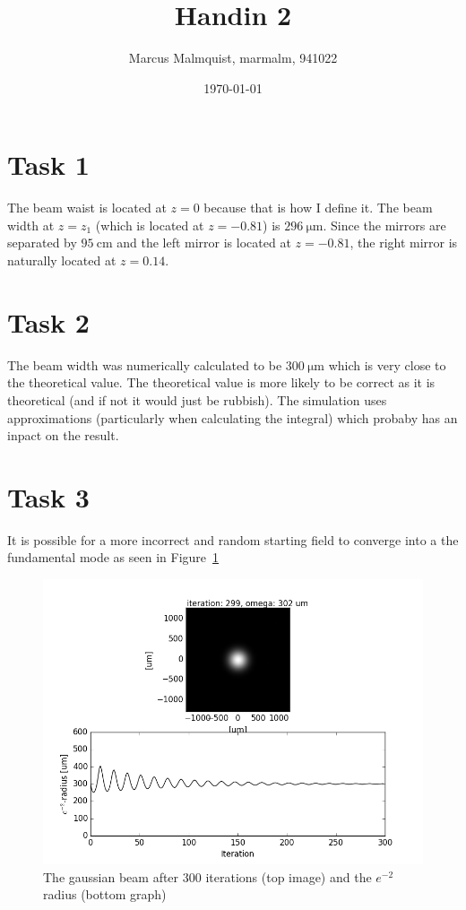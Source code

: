 \documentclass[12pt,a4paper]{article}
\title{Handin 2}
\author{Marcus Malmquist, marmalm, 941022}
\date{\today}
\begin{document}
\maketitle

\section{Task 1}\label{sec:1}
The beam waist is located at $z=0$ because that is how I define it. The beam width at $z=z_1$ (which is located at $z=-0.81$) is $\SI{296}{\micro\metre}$. Since the mirrors are separated by $\SI{95}{\centi\metre}$ and the left mirror is located at $z=-0.81$, the right mirror is naturally located at $z=0.14$.

\section{Task 2}\label{sec:2}
The beam width was numerically calculated to be $\SI{300}{\micro\metre}$ which is very close to the theoretical value. The theoretical value is more likely to be correct as it is theoretical (and if not it would just be rubbish). The simulation uses approximations (particularly when calculating the integral) which probaby has an inpact on the result.

\section{Task 3}\label{sec:3}
It is possible for a more incorrect and random starting field to converge into a the fundamental mode as seen in Figure~\ref{fig:task3}
\begin{figure}[ht!]
  \centering
  \includegraphics[width=\textwidth]{3_gauss_0_0.png}
  \caption{The gaussian beam after 300 iterations (top image) and the $e^{-2}$ radius (bottom graph)}
  \label{fig:task3}
\end{figure}
\end{document}
